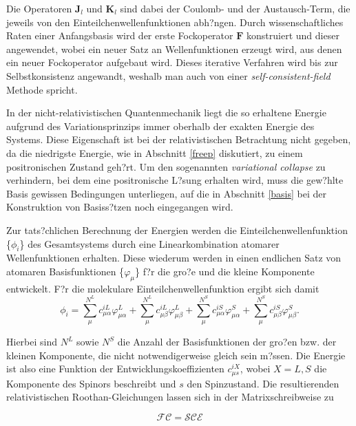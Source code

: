 Die Operatoren $\mathbf{J}_l$ und $\mathbf{K}_l$ sind dabei der Coulomb- und der Austausch-Term, die jeweils von den Einteilchenwellenfunktionen abh?ngen. Durch wissenschaftliches Raten einer Anfangsbasis wird der erste Fockoperator $\mathbf{F}$ konstruiert und dieser angewendet, wobei ein neuer Satz an Wellenfunktionen erzeugt wird, aus denen ein neuer Fockoperator aufgebaut wird. Dieses iterative Verfahren wird bis zur Selbstkonsistenz angewandt, weshalb man auch von einer \emph{self-consistent-field} Methode spricht.\cite{szabo}

In der nicht-relativistischen Quantenmechanik liegt die so erhaltene Energie aufgrund des Variationsprinzips immer oberhalb der exakten Energie des Systems. Diese Eigenschaft ist bei der relativistischen Betrachtung nicht gegeben, da die niedrigste Energie, wie in Abschnitt \ref{freep} diskutiert, zu einem positronischen Zustand geh?rt. Um den sogenannten \emph{variational collapse} zu verhindern, bei dem eine positronische L?sung erhalten wird, muss die gew?hlte Basis gewissen Bedingungen unterliegen, auf die in Abschnitt \ref{basis} bei der Konstruktion von Basiss?tzen noch eingegangen wird.
 
Zur tats?chlichen Berechnung der Energien werden die Einteilchenwellenfunktion \{$\phi_i$\} des Gesamtsystems durch eine Linearkombination atomarer Wellenfunktionen erhalten. Diese wiederum werden in einen endlichen Satz von atomaren Basisfunktionen \{$\varphi_\mu$\} f?r die gro?e und die kleine Komponente entwickelt. F?r die molekulare Einteilchenwellenfunktion ergibt sich damit
\begin{equation}
\phi_i = \sum\limits_\mu^{N^L} c_{\mu\alpha}^{iL} \varphi_{\mu\alpha}^L +  \sum\limits_\mu^{N^L} c_{\mu\beta}^{iL} \varphi_{\mu\beta}^L + \sum\limits_\mu^{N^S} c_{\mu\alpha}^{iS} \varphi_{\mu\alpha}^S + \sum\limits_\mu^{N^S} c_{\mu\beta}^{iS} \varphi_{\mu\beta}^S.
\end{equation}

Hierbei sind $N^L$ sowie $N^S$ die Anzahl der Basisfunktionen der gro?en bzw. der kleinen Komponente, die nicht notwendigerweise gleich sein m?ssen. Die Energie ist also eine Funktion der Entwicklungskoeffizienten $c_{\mu s}^{iX}$, wobei $X=L,S$ die Komponente des Spinors beschreibt und $s$ den Spinzustand. Die resultierenden relativistischen Roothan-Gleichungen lassen sich in der Matrixschreibweise zu

\begin{equation}
\mathcal{FC} = \mathcal{SCE}
\end{equation}

